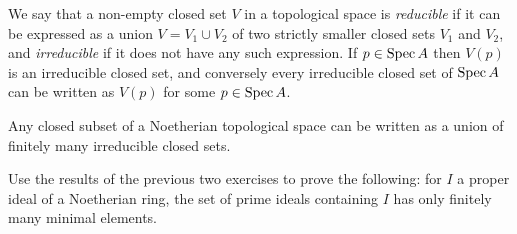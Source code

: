 \begin{exercise}\label{ex:4.10-ex}
We say that a non-empty closed set $V$ in a topological space is \emph{reducible} if
it can be expressed as a union $V = V_1 \cup V_2$ of two strictly smaller closed
sets $V_1$ and $V_2$, and \emph{irreducible} if it does not have any such expression. If
$p \in \operatorname{Spec} A$ then $V(p)$ is an irreducible closed set, and conversely every
irreducible closed set of $\operatorname{Spec} A$ can be written as $V(p)$ for some $p \in \operatorname{Spec} A$.
\end{exercise}

\begin{exercise}\label{ex:4.11-ex}
Any closed subset of a Noetherian topological space can be written as a
union of finitely many irreducible closed sets.
\end{exercise}

\begin{exercise}\label{ex:4.12-ex}
Use the results of the previous two exercises to prove the following: for $I$ a
proper ideal of a Noetherian ring, the set of prime ideals containing $I$ has
only finitely many minimal elements.
\end{exercise}
